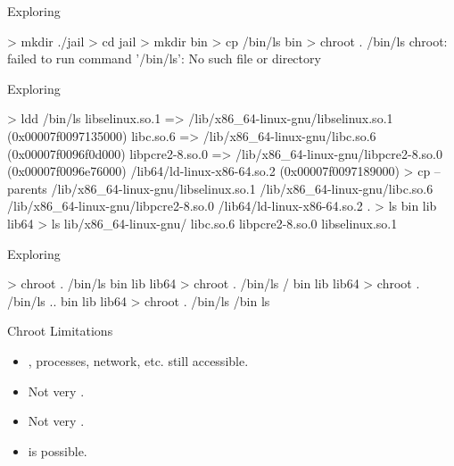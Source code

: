 \documentclass{slide}
\begin{document}

\begin{frame}[fragile]{Exploring }
    \begin{code}[numbers=none]{}
> mkdir ./jail
> cd jail
> mkdir bin
> cp /bin/ls bin
> chroot . /bin/ls
chroot: failed to run command '/bin/ls': No such file or directory
    \end{code}
\end{frame}

\begin{frame}[fragile]{Exploring }
    \vspace{-0.5em}
    \begin{code}[numbers=none]{}
> ldd /bin/ls
    libselinux.so.1 => /lib/x86_64-linux-gnu/libselinux.so.1 (0x00007f0097135000)
    libc.so.6 => /lib/x86_64-linux-gnu/libc.so.6 (0x00007f0096f0d000)
    libpcre2-8.so.0 => /lib/x86_64-linux-gnu/libpcre2-8.so.0 (0x00007f0096e76000)
    /lib64/ld-linux-x86-64.so.2 (0x00007f0097189000)
> cp --parents /lib/x86_64-linux-gnu/libselinux.so.1 /lib/x86_64-linux-gnu/libc.so.6 /lib/x86_64-linux-gnu/libpcre2-8.so.0 /lib64/ld-linux-x86-64.so.2 .
> ls
bin  lib  lib64
> ls lib/x86_64-linux-gnu/
libc.so.6  libpcre2-8.so.0  libselinux.so.1
    \end{code}
\end{frame}

\begin{frame}[fragile]{Exploring }
    \begin{code}[numbers=none]{}
> chroot . /bin/ls
bin  lib  lib64
> chroot . /bin/ls /
bin  lib  lib64
> chroot . /bin/ls ..
bin  lib  lib64
> chroot . /bin/ls /bin
ls
    \end{code}
\end{frame}

\begin{frame}[fragile]{Chroot Limitations}
    \begin{itemize}
        \item {}, processes, network, etc. still accessible.
        \item Not very .
        \item Not very .
        \item {} is possible.
    \end{itemize}
\end{frame}
\end{document}
